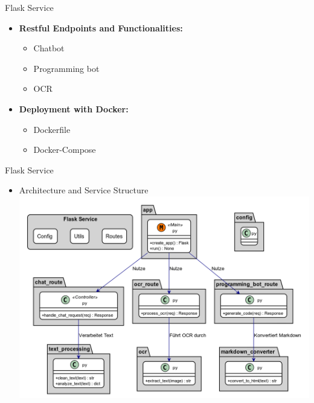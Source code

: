 \documentclass{beamer}
\begin{document}
\begin{frame}{Flask Service}
  \begin{itemize}
    \item \textbf{Restful Endpoints and Functionalities:}
    \begin{itemize}
      \item Chatbot 
      \item Programming bot
      \item OCR 
    \end{itemize}
    \item \textbf{Deployment with Docker:}
    \begin{itemize}
      \item Dockerfile
      \item Docker-Compose
    \end{itemize}
  \end{itemize}
\end{frame}

\begin{frame}{Flask Service}
  \begin{itemize}
    \item Architecture and Service Structure
    \includegraphics[width=\textwidth]{flask_service.png}
  \end{itemize}
\end{frame}
\end{document}
